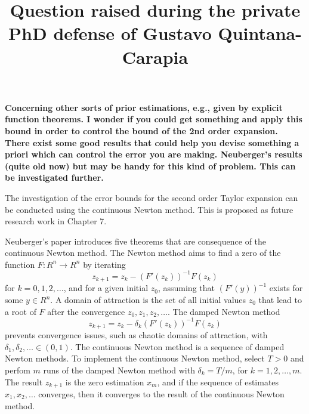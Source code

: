 \documentclass[11pt]{article}
\date{\vspace{-10ex}}
\begin{document}
\title{Question raised during the private PhD defense of \linebreak Gustavo Quintana-Carapia} 

\maketitle

{\bfseries Concerning other sorts of prior estimations, e.g., given by explicit function theorems. I wonder if you could get something and apply this bound in order to control the bound of the 2nd order expansion. There exist some good results that could help you devise something a priori which can control the error you are making. Neuberger's results (quite old now) but may be handy for this kind of problem. This can be investigated further.}

\vspace{0.7cm}
The investigation of the error bounds for the second order Taylor expansion can be conducted using the continuous Newton method. This is proposed as future research work in Chapter 7.
\vspace{0.7cm}

\color{blue}
	Neuberger's paper \cite{Neuberger07} introduces five theorems that are consequence of the continuous Newton method.
	The Newton method aims to find a zero of the function $F: R^n \rightarrow R^n$ by iterating
	\begin{equation} z_{k+1} = z_k - \left(F' (z_k) \right)^{-1} F(z_k) \end{equation}
	for $k=0,1,2,\ldots$, and for a given initial $z_0$, assuming that $\left(F' (y) \right)^{-1}$ exists for some $y \in R^n$.
	A domain of attraction is the set of all initial values $z_0$ that lead to a root of $F$ after the convergence $z_0, z_1, z_2,\ldots$.
	The damped Newton method  
	\begin{equation} z_{k+1} = z_k - \delta_k \left(F' (z_k) \right)^{-1} F(z_k) \end{equation}
	prevents convergence issues, such as chaotic domains of attraction, with $\delta_1, \delta_2, \ldots \in (0, 1)$. 
	The continuous Newton method is a sequence of damped Newton methods. To implement the continuous Newton method, select $T>0$ and perfom $m$ runs of the damped Newton method with $\delta_k = T/m$, for $k=1,2,\ldots, m$.
	The result $z_{k+1}$ is the zero estimation $x_m$, and if the sequence of estimates $x_1, x_2, \ldots$ converges, then it converges to the result of the continuous Newton method.
	
\end{document}
